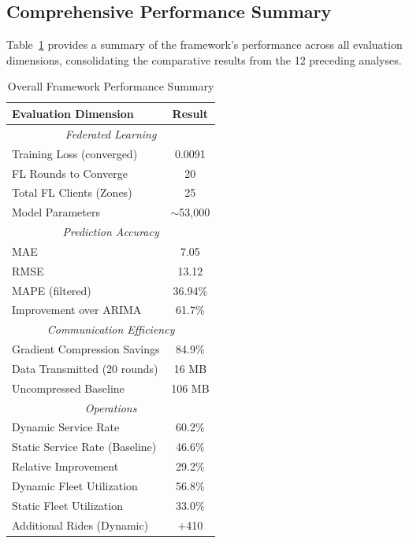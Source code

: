 \documentclass[journal]{IEEEtran}
\begin{document}
\subsection{Comprehensive Performance Summary}

Table~\ref{tab:overall} provides a summary of the framework's performance across all evaluation dimensions, consolidating the comparative results from the 12 preceding analyses.

\begin{table}[!htbp]
\centering
\caption{Overall Framework Performance Summary}
\label{tab:overall}
\begin{tabular}{l c}
\toprule
\textbf{Evaluation Dimension} & \textbf{Result} \\
\midrule
\multicolumn{2}{c}{\textit{Federated Learning}} \\
Training Loss (converged) & 0.0091 \\
FL Rounds to Converge & 20 \\
Total FL Clients (Zones) & 25 \\
Model Parameters & $\sim$53,000 \\
\midrule
\multicolumn{2}{c}{\textit{Prediction Accuracy}} \\
MAE & 7.05 \\
RMSE & 13.12 \\
MAPE (filtered) & 36.94\% \\
Improvement over ARIMA & 61.7\% \\
\midrule
\multicolumn{2}{c}{\textit{Communication Efficiency}} \\
Gradient Compression Savings & 84.9\% \\
Data Transmitted (20 rounds) & 16 MB \\
Uncompressed Baseline & 106 MB \\
\midrule
\multicolumn{2}{c}{\textit{Operations}} \\
Dynamic Service Rate & 60.2\% \\
Static Service Rate (Baseline) & 46.6\% \\
Relative Improvement & 29.2\% \\
Dynamic Fleet Utilization & 56.8\% \\
Static Fleet Utilization & 33.0\% \\
Additional Rides (Dynamic) & +410 \\
\bottomrule
\end{tabular}
\end{table}
\end{document}

